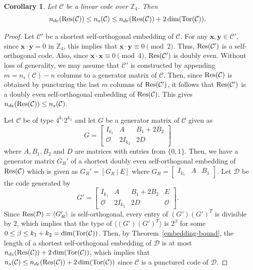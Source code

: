 \documentclass{article}
\newtheorem{corollary}[theorem]{Corollary}
\theoremstyle{definition}
\theoremstyle{remark}
\begin{document}
\begin{corollary}\label{SOembeddingres}
    Let $\mathcal{C}$ be a linear code over $\mathbb{Z}_4$. Then
    \[
    n_{de}({\rm{Res}}(\mathcal{C}))\le n_s(\mathcal{C})\le n_{de}({\rm{Res}}(\mathcal{C}))+2\dim({\rm{Tor}}(\mathcal{C})).
    \]
\end{corollary}
\begin{proof}
Let $\mathcal{C}'$ be a shortest self-orthogonal embedding of $\mathcal{C}$. For any $\mathbf{x}, \mathbf{y}\in \mathcal{C}'$, since $\mathbf{x}\cdot \mathbf{y}= 0$ in $\mathbb{Z}_4$, this implies that $\mathbf{x}\cdot \mathbf{y}\equiv 0\pmod 2$. Thus, ${\rm{Res}}(\mathcal{C'})$ is a self-orthogonal code. Also, since $\mathbf{x}\cdot\mathbf{x}\equiv 0\pmod 4$, ${\rm{Res}}(\mathcal{C'})$ is doubly even. Without loss of generality, we may assume that $\mathcal{C}'$ is constructed by appending $m=n_s(\mathcal{C})-n$ columns to a generator matrix of $\mathcal{C}$. Then, since ${\rm{Res}}(\mathcal{C})$ is obtained by puncturing the last $m$ columns of ${\rm{Res}}(\mathcal{C}')$, it follows that ${\rm{Res}}(\mathcal{C}')$ is a doubly even self-orthogonal embedding of ${\rm{Res}}(\mathcal{C})$. This gives $n_{de}({\rm{Res}}(\mathcal{C}))\le n_s(\mathcal{C})$.

Let $\mathcal{C}$ be of type $4^{k_1}2^{k_2}$ and let $G$ be a generator matrix of $\mathcal{C}$ given as
\[
 G=\begin{bmatrix}
        I_{k_1} & A & B_1+2B_2\\\mathcal{O} & 2I_{k_2} & 2D
    \end{bmatrix}
\]
where $A, B_1, B_2$ and $D$ are matrices with entries from $\{0, 1\}$. Then, we have a generator matrix $G_R'$ of a shortest doubly even self-orthogonal embedding of ${\rm Res}(\mathcal{C})$ which is given as $G_R'=[G_R~|~E]$ where $G_R=\begin{bmatrix} I_{k_1} & A & B_1 \end{bmatrix}$. Let $\mathcal{D}$ be the code generated by
\[
G'=\begin{bmatrix}
        I_{k_1} & A & B_1+2B_2 & E\\\mathcal{O} & 2I_{k_2} & 2D & \mathcal{O}
    \end{bmatrix}.
\]
Since ${\rm{Res}}(\mathcal{D})=\langle G_R'\rangle$ is self-orthogonal, every entry of $(G')(G')^T$ is divisible by $2$, which implies that the type of $\langle (G')(G')^T\rangle$ is $2^\beta$ for some $0\le \beta\le k_1+k_2=\dim({\rm Tor}(\mathcal{C}))$. Then, by Theorem~\ref{embedding-bound}, the length of a shortest self-orthogonal embedding of $\mathcal{D}$ is at most $n_{de}({\rm{Res}}(\mathcal{C}))+2\dim({\rm{Tor}}(\mathcal{C}))$, which implies that $n_s(\mathcal{C})\le n_{de}({\rm{Res}}(\mathcal{C}))+2\dim({\rm{Tor}}(\mathcal{C}))$ since $\mathcal{C}$ is a punctured code of $\mathcal{D}$.
\end{proof}
\end{document}
